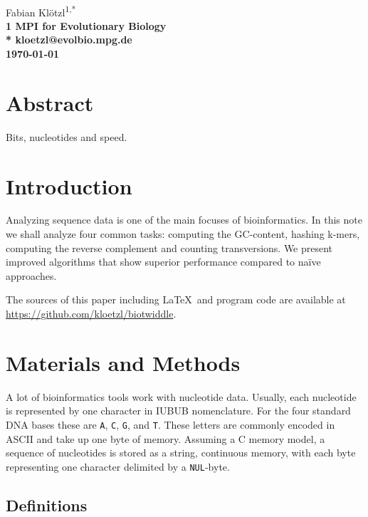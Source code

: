 \documentclass[10pt,letterpaper]{article}
\begin{document}
\vspace*{0.35in}

\begin{flushleft}
{\Large
\textbf{}
}
\newline
\\
Fabian Klötzl\textsuperscript{1,*}
\\
\bigskip
\bf{1} MPI for Evolutionary Biology
\\
\bigskip
* kloetzl@evolbio.mpg.de
\\
\today
\end{flushleft}

\section*{Abstract}
Bits, nucleotides and speed.

\linenumbers


\section{Introduction}

Analyzing sequence data is one of the main focuses of bioinformatics. In this note we shall analyze four common tasks: computing the GC-content, hashing k-mers, computing the reverse complement and counting transversions. We present improved algorithms that show superior performance compared to naïve approaches.

The sources of this paper including \LaTeX\ and program code are available at \url{https://github.com/kloetzl/biotwiddle}.

\section{Materials and Methods}

A lot of bioinformatics tools work with nucleotide data. Usually, each nucleotide is represented by one character in IUBUB nomenclature. For the four standard DNA bases these are \texttt{A}, \texttt{C}, \texttt{G}, and \texttt{T}. These letters are commonly encoded in ASCII and take up one byte of memory. Assuming a C memory model, a sequence of nucleotides is stored as a string, continuous memory, with each byte representing one character delimited by a \texttt{NUL}-byte.

\subsection{Definitions}
\end{document}
